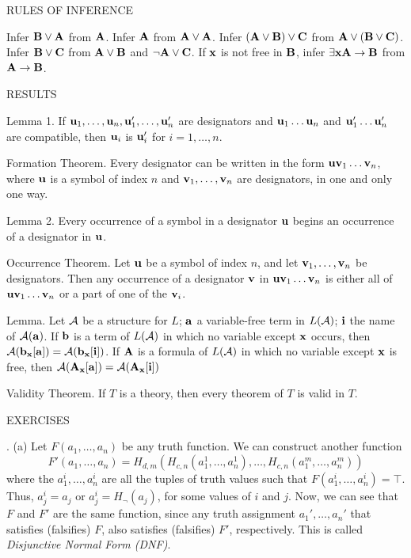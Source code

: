 \beginsection RULES OF INFERENCE

{\leftskip 1in
 Infer ${\bf B} \lor {\bf A}$ from ${\bf A}$.
 Infer ${\bf A}$ from ${\bf A} \lor {\bf A}$.
 Infer $({\bf A} \lor {\bf B}) \lor {\bf C}$ from ${\bf A} \lor ({\bf B} \lor {\bf C})$.
 Infer ${\bf B} \lor {\bf C}$ from ${\bf A} \lor {\bf B}$ and $\neg{\bf A} \lor {\bf C}$.
 If ${\bf x}$ is not free in ${\bf B}$, infer $\exists {\bf x}{\bf A} \to {\bf B}$ from ${\bf A} \to {\bf B}$.
\par}

\beginsection RESULTS


\proclaim Lemma 1.
If ${\bf u}_1, \dots, {\bf u}_n, {\bf u}_1', \dots, {\bf u}_n'$ are designators
and ${\bf u}_1 \dots {\bf u}_n$ and ${\bf u}_1' \dots {\bf u}_n'$ are compatible,
then ${\bf u}_i$ is ${\bf u}'_i$ for $i = 1, \dots , n$.

\proclaim Formation Theorem.
Every designator can be written in the form ${\bf u}{\bf v}_1\dots{\bf v}_n$, where 
$\bf u$ is a symbol of index $n$ and ${\bf v}_1, \dots, {\bf v}_n$ are 
designators, in one and only one way.

\proclaim Lemma 2.
Every occurrence of a symbol in a designator $\bf u$ begins an occurrence of a
designator in $\bf u$.

\proclaim Occurrence Theorem.
Let $\bf u$ be a symbol of index $n$, and let ${\bf v}_1, \dots, {\bf v}_n$ be 
designators. Then any occurrence of a designator $\bf v$ in ${\bf u}{\bf v}_1 \dots {\bf v}_n$
is either all of ${\bf u}{\bf v}_1 \dots {\bf v}_n$ or a part of one of the ${\bf v}_i$.


\proclaim Lemma.
Let $\cal A$ be a structure for $L$; $\bf a$ a variable-free term in $L({\cal A})$;
$\bf i$ the name of ${\cal A}({\bf a})$. If $\bf b$ is a term of $L({\cal A})$ in
which no variable except $\bf x$ occurs, then ${\cal A}({\bf b_x}[{\bf a}]) = {\cal A}({\bf b_x}[{\bf i}])$.
If ${\bf A}$ is a formula of $L({\cal A})$ in which no variable except $\bf x$ is 
free, then ${\cal A}({\bf A_x}[{\bf a}]) = {\cal A}({\bf A_x}[{\bf i}])$

\proclaim Validity Theorem.
If $T$ is a theory, then every theorem of $T$ is valid in $T$.

\beginsection EXERCISES

.
\ansitem (a) Let $F(a_1, \dots, a_n)$ be any truth function. We can construct 
another function
$$
F'(a_1, \dots, a_n) = H_{d,m}( H_{c,n}(a_1^1, \dots, a_n^1), \dots, H_{c,n}(a_1^m, \dots, a_n^m) )
$$
where the $a_1^i, \dots, a_n^i$ are all the tuples of truth values such that 
$F(a_1^i, \dots, a_n^i) = \top$. Thus, $a_j^i = a_j$ or $a_j^i = H_\neg(a_j)$, 
for some values of $i$ and $j$. Now, we can see that $F$ and $F'$ are the same 
function, since any truth assignment $a_1', \dots, a_n'$ that satisfies (falsifies) 
$F$, also satisfies (falsifies) $F'$, respectively. This is called 
{\it Disjunctive Normal Form (DNF)}.

